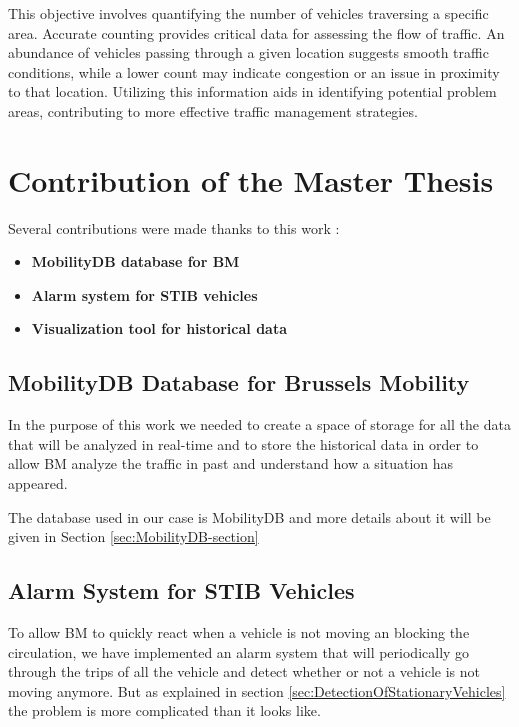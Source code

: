\documentclass[12pt]{report}
\begin{document}
	This objective involves quantifying the number of vehicles traversing a specific area. Accurate counting provides critical data for assessing the flow of traffic. An abundance of vehicles passing through a given location suggests smooth traffic conditions, while a lower count may indicate congestion or an issue in proximity to that location. Utilizing this information aids in identifying potential problem areas, contributing to more effective traffic management strategies.
	
	 
	
	\section{Contribution of the Master Thesis}	
	
	Several contributions were made thanks to this work :
	\begin{itemize}[noitemsep]
		\item \textbf{MobilityDB database for BM}
		\item \textbf{Alarm system for STIB vehicles}
		\item \textbf{Visualization tool for historical data}
	\end{itemize}
	
	\subsection{MobilityDB Database for Brussels Mobility}
	
	In the purpose of this work we needed to create a space of storage for all the data that will be analyzed in real-time and to store the historical data in order to allow BM analyze the traffic in past and understand how a situation has appeared.
	
	The database used in our case is MobilityDB and more details about it will be given in Section \ref{sec:MobilityDB-section}
	
	\subsection{Alarm System for STIB Vehicles}
	
	To allow BM to quickly react when a vehicle is not moving an blocking the circulation, we have implemented an alarm system that will periodically go through the trips of all the vehicle and detect whether or not a vehicle is not moving anymore. But as explained in section \ref{sec:DetectionOfStationaryVehicles} the problem is more complicated than it looks like.
	
\end{document}
